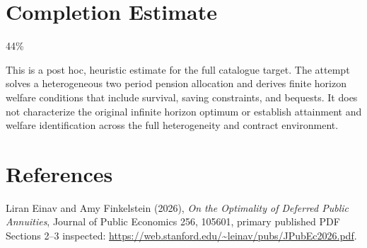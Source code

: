 \documentclass[11pt]{article}
\begin{document}
\section{Completion Estimate}
44\%

This is a post hoc, heuristic estimate for the full catalogue target.
The attempt solves a heterogeneous two period pension allocation and derives finite horizon welfare conditions that include survival, saving constraints, and bequests. It does not characterize the original infinite horizon optimum or establish attainment and welfare identification across the full heterogeneity and contract environment.

\section*{References}
Liran Einav and Amy Finkelstein (2026), \emph{On the Optimality of Deferred Public Annuities}, Journal of Public Economics 256, 105601, primary published PDF Sections 2--3 inspected:
\url{https://web.stanford.edu/~leinav/pubs/JPubEc2026.pdf}.
\end{document}
